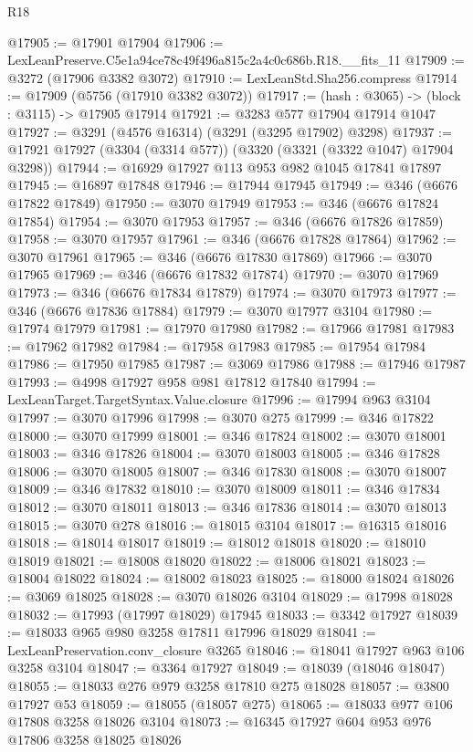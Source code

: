 \begin{lexlean}{R18}
\begin{coremodule}
@17905 := @17901 @17904
@17906 := LexLeanPreserve.C5e1a94ce78c49f496a815c2a4c0c686b.R18.__fits_11
@17909 := @3272 (@17906 @3382 @3072)
@17910 := LexLeanStd.Sha256.compress
@17914 := @17909 (@5756 (@17910 @3382 @3072))
@17917 := (hash : @3065) -> (block : @3115) -> @17905 @17914
@17921 := @3283 @577 @17904 @17914 @1047
@17927 := @3291 (@4576 @16314) (@3291 (@3295 @17902) @3298)
@17937 := @17921 @17927 (@3304 (@3314 @577)) (@3320 (@3321 (@3322 @1047) @17904 @3298))
@17944 := @16929 @17927 @113 @953 @982 @1045 @17841 @17897
@17945 := @16897 @17848
@17946 := @17944 @17945
@17949 := @346 (@6676 @17822 @17849)
@17950 := @3070 @17949
@17953 := @346 (@6676 @17824 @17854)
@17954 := @3070 @17953
@17957 := @346 (@6676 @17826 @17859)
@17958 := @3070 @17957
@17961 := @346 (@6676 @17828 @17864)
@17962 := @3070 @17961
@17965 := @346 (@6676 @17830 @17869)
@17966 := @3070 @17965
@17969 := @346 (@6676 @17832 @17874)
@17970 := @3070 @17969
@17973 := @346 (@6676 @17834 @17879)
@17974 := @3070 @17973
@17977 := @346 (@6676 @17836 @17884)
@17979 := @3070 @17977 @3104
@17980 := @17974 @17979
@17981 := @17970 @17980
@17982 := @17966 @17981
@17983 := @17962 @17982
@17984 := @17958 @17983
@17985 := @17954 @17984
@17986 := @17950 @17985
@17987 := @3069 @17986
@17988 := @17946 @17987
@17993 := @4998 @17927 @958 @981 @17812 @17840
@17994 := LexLeanTarget.TargetSyntax.Value.closure
@17996 := @17994 @963 @3104
@17997 := @3070 @17996
@17998 := @3070 @275
@17999 := @346 @17822
@18000 := @3070 @17999
@18001 := @346 @17824
@18002 := @3070 @18001
@18003 := @346 @17826
@18004 := @3070 @18003
@18005 := @346 @17828
@18006 := @3070 @18005
@18007 := @346 @17830
@18008 := @3070 @18007
@18009 := @346 @17832
@18010 := @3070 @18009
@18011 := @346 @17834
@18012 := @3070 @18011
@18013 := @346 @17836
@18014 := @3070 @18013
@18015 := @3070 @278
@18016 := @18015 @3104
@18017 := @16315 @18016
@18018 := @18014 @18017
@18019 := @18012 @18018
@18020 := @18010 @18019
@18021 := @18008 @18020
@18022 := @18006 @18021
@18023 := @18004 @18022
@18024 := @18002 @18023
@18025 := @18000 @18024
@18026 := @3069 @18025
@18028 := @3070 @18026 @3104
@18029 := @17998 @18028
@18032 := @17993 (@17997 @18029) @17945
@18033 := @3342 @17927
@18039 := @18033 @965 @980 @3258 @17811 @17996 @18029
@18041 := LexLeanPreservation.conv_closure @3265
@18046 := @18041 @17927 @963 @106 @3258 @3104
@18047 := @3364 @17927
@18049 := @18039 (@18046 @18047)
@18055 := @18033 @276 @979 @3258 @17810 @275 @18028
@18057 := @3800 @17927 @53
@18059 := @18055 (@18057 @275)
@18065 := @18033 @977 @106 @17808 @3258 @18026 @3104
@18073 := @16345 @17927 @604 @953 @976 @17806 @3258 @18025 @18026

\end{coremodule}
\end{lexlean}
